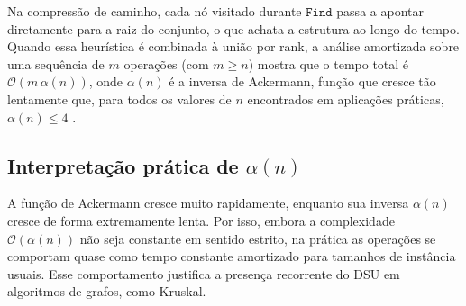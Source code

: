 Na compressão de caminho, cada nó visitado durante $\texttt{Find}$ passa a apontar diretamente para a raiz do conjunto, o que achata a estrutura ao longo do tempo. Quando essa heurística é combinada à união por rank, a análise amortizada sobre uma sequência de $m$ operações (com $m \geq n$) mostra que o tempo total é $\mathcal{O}(m\,\alpha(n))$, onde $\alpha(n)$ é a inversa de Ackermann, função que cresce tão lentamente que, para todos os valores de $n$ encontrados em aplicações práticas, $\alpha(n)\leq 4$ \cite{tarjan1975efficiency}.

\subsection{Interpretação prática de $\alpha(n)$}

A função de Ackermann cresce muito rapidamente, enquanto sua inversa $\alpha(n)$ cresce de forma extremamente lenta. Por isso, embora a complexidade $\mathcal{O}(\alpha(n))$ não seja constante em sentido estrito, na prática as operações se comportam quase como tempo constante amortizado para tamanhos de instância usuais. Esse comportamento justifica a presença recorrente do DSU em algoritmos de grafos, como Kruskal.
